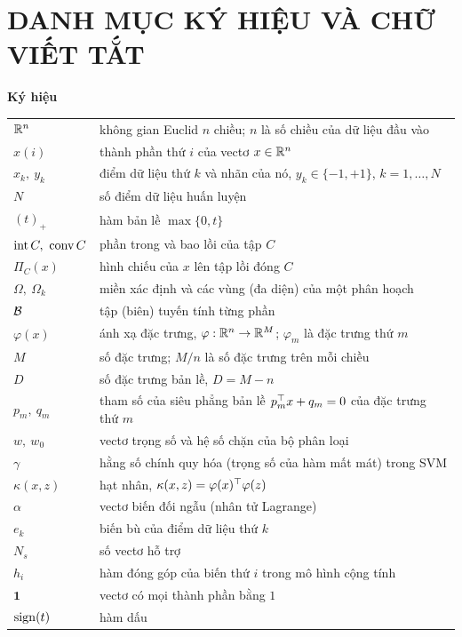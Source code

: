 \chapter*{DANH MỤC KÝ HIỆU VÀ CHỮ VIẾT TẮT}

\begingroup
\renewcommand{\arraystretch}{1.18}
\noindent\textbf{Ký hiệu}

\smallskip
\noindent\begin{tabularx}{\linewidth}{@{}p{3.1cm}X@{}}
$\mathbb{R}^n$ & không gian Euclid $n$ chiều; $n$ là số chiều của dữ liệu đầu vào\\
$x(i)$ & thành phần thứ $i$ của vectơ $x\in\mathbb{R}^n$\\
$x_k,\ y_k$ & điểm dữ liệu thứ $k$ và nhãn của nó, $y_k\in\{-1,+1\}$, $k=1,\dots,N$\\
$N$ & số điểm dữ liệu huấn luyện\\
$(t)_+$ & hàm bản lề $\max\{0,t\}$\\
$\operatorname{int} C,\ \operatorname{conv} C$ & phần trong và bao lồi của tập $C$\\
$\Pi_C(x)$ & hình chiếu của $x$ lên tập lồi đóng $C$\\
$\Omega,\ \Omega_k$ & miền xác định và các vùng (đa diện) của một phân hoạch\\
$\mathcal{B}$ & tập (biên) tuyến tính từng phần\\
$\varphi(x)$ & ánh xạ đặc trưng, $\varphi:\mathbb{R}^n\to\mathbb{R}^M$; $\varphi_m$ là đặc trưng thứ $m$\\
$M$ & số đặc trưng; $M/n$ là số đặc trưng trên mỗi chiều\\
$D$ & số đặc trưng bản lề, $D=M-n$\\
$p_m,\ q_m$ & tham số của siêu phẳng bản lề $p_m^\top x+q_m=0$ của đặc trưng thứ $m$\\
$w,\ w_0$ & vectơ trọng số và hệ số chặn của bộ phân loại\\
$\gamma$ & hằng số chính quy hóa (trọng số của hàm mất mát) trong SVM\\
$\kappa(x,z)$ & hạt nhân, $\kappa(x,z)=\varphi(x)^\top\varphi(z)$\\
$\alpha$ & vectơ biến đối ngẫu (nhân tử Lagrange)\\
$e_k$ & biến bù của điểm dữ liệu thứ $k$\\
$N_s$ & số vectơ hỗ trợ\\
$h_i$ & hàm đóng góp của biến thứ $i$ trong mô hình cộng tính\\
$\mathbf 1$ & vectơ có mọi thành phần bằng $1$\\
$\operatorname{sign}(t)$ & hàm dấu\\
\end{tabularx}

